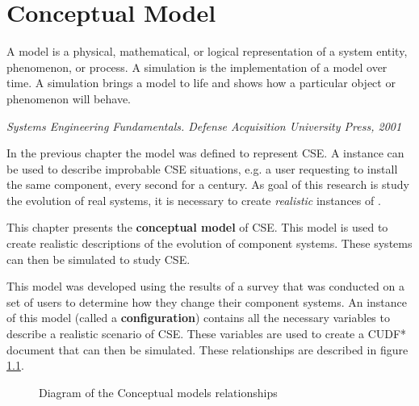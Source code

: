 \chapter{Conceptual Model}
\label{simulation}
\epigraph{A model is a physical, mathematical, or logical representation of a system entity, phenomenon, or process. 
A simulation is the implementation of a model over time. 
A simulation brings a model to life and shows how a particular object or phenomenon will behave.}
{\textit{Systems Engineering Fundamentals. Defense Acquisition University Press, 2001}}

In the previous chapter the \modelname model was defined to represent CSE.
A \modelname instance can be used to describe improbable CSE situations, 
e.g. a user requesting to install the same component, every second for a century.
As goal of this research is study the evolution of real systems, 
it is necessary to create \textit{realistic} instances of \modelname.

This chapter presents the \textbf{conceptual model} of CSE.
This model is used to create realistic descriptions of the evolution of component systems.
These systems can then be simulated to study CSE.

This model was developed using the results of a survey that was conducted on a set of users to determine how they change their component systems.
An instance of this model (called a \textbf{configuration}) contains all the necessary variables to describe a realistic scenario of CSE.
These variables are used to create a CUDF* document that can then be simulated.
These relationships are described in figure \ref{sim.modeldiagram}.

\begin{figure}[htp]
\begin{center}
  \caption{Diagram of the Conceptual models relationships}
  \label{sim.modeldiagram}
\end{center}
\end{figure}

